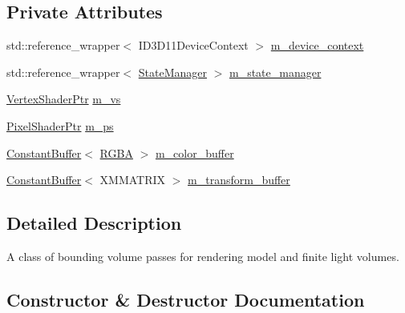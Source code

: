 \subsection*{Private Attributes}
\begin{DoxyCompactItemize}
\item 
std\+::reference\+\_\+wrapper$<$ I\+D3\+D11\+Device\+Context $>$ \hyperlink{classmage_1_1rendering_1_1_bounding_volume_pass_add230562e9ecd5454a7a2af73cd33f3f}{m\+\_\+device\+\_\+context}
\item 
std\+::reference\+\_\+wrapper$<$ \hyperlink{classmage_1_1rendering_1_1_state_manager}{State\+Manager} $>$ \hyperlink{classmage_1_1rendering_1_1_bounding_volume_pass_a9e27e086186f11b111204323c162f9aa}{m\+\_\+state\+\_\+manager}
\item 
\hyperlink{namespacemage_1_1rendering_aaf704b9c54a4181f4950a1761de69dda}{Vertex\+Shader\+Ptr} \hyperlink{classmage_1_1rendering_1_1_bounding_volume_pass_aed191e277603f097bcd55501339fd279}{m\+\_\+vs}
\item 
\hyperlink{namespacemage_1_1rendering_af03d922b228ee9c8542baaa2ecc9f259}{Pixel\+Shader\+Ptr} \hyperlink{classmage_1_1rendering_1_1_bounding_volume_pass_a3faf9a381430a40cf6044ae91bd5d31d}{m\+\_\+ps}
\item 
\hyperlink{classmage_1_1rendering_1_1_constant_buffer}{Constant\+Buffer}$<$ \hyperlink{structmage_1_1_r_g_b_a}{R\+G\+BA} $>$ \hyperlink{classmage_1_1rendering_1_1_bounding_volume_pass_aac94b66aef4f01245c8526392a61cd88}{m\+\_\+color\+\_\+buffer}
\item 
\hyperlink{classmage_1_1rendering_1_1_constant_buffer}{Constant\+Buffer}$<$ X\+M\+M\+A\+T\+R\+IX $>$ \hyperlink{classmage_1_1rendering_1_1_bounding_volume_pass_a814cde2a674f4c6e4052e5af740253b3}{m\+\_\+transform\+\_\+buffer}
\end{DoxyCompactItemize}


\subsection{Detailed Description}
A class of bounding volume passes for rendering model and finite light volumes. 

\subsection{Constructor \& Destructor Documentation}
\hypertarget{classmage_1_1rendering_1_1_bounding_volume_pass_ac612308d7f54297f2357b0071699979d}{}\label{classmage_1_1rendering_1_1_bounding_volume_pass_ac612308d7f54297f2357b0071699979d} 
